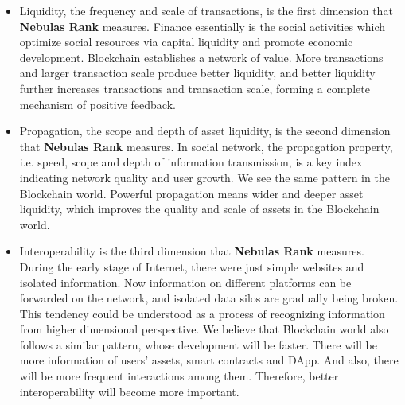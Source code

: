 \begin{itemize}
	\item Liquidity, the frequency and scale of transactions, is the first dimension that \textbf{Nebulas Rank} measures. Finance essentially is the social activities which optimize social resources via capital liquidity and promote economic development. Blockchain establishes a network of value. More transactions and larger transaction scale produce better liquidity, and better liquidity further increases transactions and transaction scale, forming a complete mechanism of positive feedback.
	\item Propagation, the scope and depth of asset liquidity, is the second dimension that \textbf{Nebulas Rank} measures. In social network, the propagation property, i.e. speed, scope and depth of information transmission, is a key index indicating network quality and user growth. We see the same pattern in the Blockchain world. Powerful propagation means wider and deeper asset liquidity, which improves the quality and scale of assets in the Blockchain world.
	\item Interoperability is the third dimension that \textbf{Nebulas Rank} measures. During the early stage of Internet, there were just simple websites and isolated information. Now information on different platforms can be forwarded on the network, and isolated data silos are gradually being broken. This tendency could be understood as a process of recognizing information from higher dimensional perspective. We believe that Blockchain world also follows a similar pattern, whose development will be faster. There will be more information of users' assets, smart contracts and DApp. And also, there will be more frequent interactions among them. Therefore, better interoperability will become more important.
\end{itemize}


